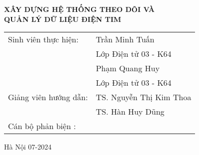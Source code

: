   \begin{center}
     \textbf{\fontsize{20pt}{0pt}\selectfont XÂY DỰNG HỆ THỐNG THEO DÕI VÀ} \\
     \textbf{\fontsize{20pt}{0pt}\selectfont QUẢN LÝ DỮ LIỆU ĐIỆN TIM }
  
  \vspace{1.5cm}
  \begin{table}[H]
       \centering
       
       \begin{tabular}{l l}
            \fontsize{14pt}{0pt}\selectfont Sinh viên thực hiện:      & \fontsize{14pt}{0pt}\selectfont Trần Minh Tuấn \\
            &\fontsize{14pt}{0pt}\selectfont Lớp Điện tử 03 - K64 \vspace{6pt} \\
            &\fontsize{14pt}{0pt}\selectfont Phạm Quang Huy  \\
            &\fontsize{14pt}{0pt}\selectfont Lớp Điện tử 03 - K64 \vspace{6pt} \\
            \fontsize{14pt}{0pt}\selectfont Giảng viên hướng dẫn: & \fontsize{14pt}{0pt}\selectfont TS. Nguyễn Thị Kim Thoa  \vspace{6pt} \\  
              &\fontsize{14pt}{0pt}\selectfont TS. Hàn Huy Dũng \vspace{6pt} \\
            \fontsize{14pt}{0pt}\selectfont Cán bộ phản biện : &
       \end{tabular}
  \end{table}
  \vspace{0.4cm} %
  \fontsize{14pt}{0pt}\selectfont Hà Nội 07-2024
  \end{center}
  
  \cleardoublepage %
  